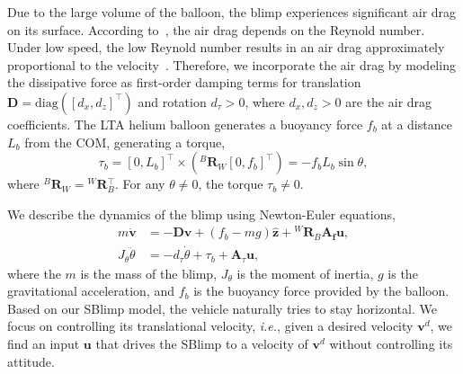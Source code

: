 \documentclass[conference]{ieeeconf}
\newtheorem{problem}{Problem}
\begin{document}
Due to the large volume of the balloon, the blimp experiences significant air drag on its surface. According to~\cite{batchelor1967introduction}, the air drag depends on the Reynold number. Under low speed, the low Reynold number results in an air drag approximately proportional to the velocity~\cite{lissaman1983low}. Therefore, we incorporate the air drag by modeling the dissipative force as first-order damping terms for translation $\boldsymbol{D} = \text{diag}\left(\left[d_x, d_z\right]^\top\right)$ and rotation $d_\tau>0$, where $d_x, d_z>0$ are the air drag coefficients. 
The LTA helium balloon generates a buoyancy force $f_b$ at a distance $L_b$ from the COM, generating a torque,
\begin{equation}
    \tau_b=\left[0, L_b\right]^\top\times\left({}^B\!\boldsymbol{R}_{\!W}\!\!\left[0, f_b\right]^\top\right) =   -f_bL_b\sin{\theta},
    \label{eq:taub}
\end{equation}
where ${}^B\!\boldsymbol{R}_{\!W} = {}^W\!\!\boldsymbol{R}\!_B^\top$. For any 
$\theta\neq0$, the torque $\tau_b\neq0$. 


We describe the dynamics of the blimp using Newton-Euler equations,
\begin{align}
    m\boldsymbol{\dot v} &= -\boldsymbol{D}{\boldsymbol{v}} + (f_b - mg)\boldsymbol{\hat z} + {}^W\!\!\boldsymbol{R}\!_B\boldsymbol{A_fu},\label{eq:Newton}\\
    J_\theta\ddot{\theta} &= -d_\tau\dot{\theta} + \tau_b + \boldsymbol{A}_\tau\boldsymbol{u},
    \label{eq:Euler}
\end{align}
where the $m$ is the mass of the blimp, $J_\theta$ is the moment of inertia, $g$ is the gravitational acceleration, and $f_b$ is the buoyancy force provided by the balloon. 
Based on our SBlimp model, the vehicle naturally tries to stay horizontal. We focus on controlling its translational velocity, \textit{i.e.}, given a desired velocity $\boldsymbol{v}^d$, we find an input $\boldsymbol{u}$ that drives the SBlimp to a velocity of $\boldsymbol{v}^d$ without controlling its attitude.
\end{document}
